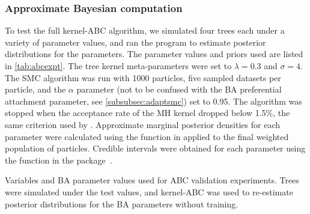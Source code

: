 \subsubsection*{Approximate Bayesian computation}

To test the full kernel-\gls{ABC} algorithm, we simulated four trees each under
a variety of parameter values, and ran the  program to
estimate posterior distributions for the parameters. The parameter values and
priors used are listed in \ref{tab:abcexpt}. The tree kernel meta-parameters
were set to $\lambda = 0.3$ and $\sigma = 4$. The \gls{SMC} algorithm was run
with 1000 particles, five sampled datasets per particle, and the $\alpha$
parameter (not to be confused with the \gls{BA} preferential attachment
parameter, see \cref{subsubsec:adaptsmc}) set to 0.95. The algorithm was
stopped when the acceptance rate of the \gls{MH} kernel dropped below 1.5\%,
the same criterion used by \citeauthor{del2012adaptive}. Approximate marginal
posterior densities for each parameter were calculated using the
 function in  applied to the final weighted
population of particles. Credible intervals were obtained for each parameter
using the  function in the 
package~\autocite{plummer2006coda}.

\begin{table}[ht]
  \centering
  
  \caption[Variables used in grid search experiments]
  {
    Variables and \gls{BA} parameter values used for \gls{ABC} validation
    experiments. Trees were simulated under the test values, and
    kernel-\gls{ABC} was used to re-estimate posterior distributions for the
    \gls{BA} parameters without training.
  }
  \label{tab:abcexpt}
\end{table}

%

